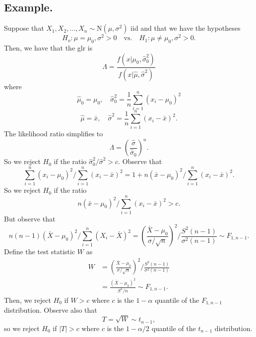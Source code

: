 \documentclass[titlepage]{article}
\begin{document}
\subsection{Example.} Suppose that $X_{1}, X_{2}, \ldots, X_{n} \sim \text{N}(\mu, \sigma^{2})$ iid and that we have the hypotheses 
$$H_{o}: \mu = \mu_{0}, \sigma^{2} > 0 \quad \text{vs.} \quad H_{1}: \mu \neq \mu_{0}, \sigma^{2} > 0.$$
Then, we have that the glr is 
$$\Lambda = \frac{f(x|\mu_{0}, \hat{\sigma}_{0}^{2})}{f(x|\hat{\mu}, \hat{\sigma}^{2})}$$
where 
$$\hat{\mu}_{0} = \mu_{0}, \quad \hat{\sigma}_{0}^{2} = \frac{1}{n}\sum_{i=1}^{n}(x_{i} - \mu_{0})^{2}$$
$$\hat{\mu} = \bar{x}, \quad \hat{\sigma}^{2} = \frac{1}{n}\sum_{i=1}^{n}(x_{i} - \bar{x})^{2}.$$
The likelihood ratio simplifies to 
$$\Lambda = \left(\frac{\hat{\sigma}}{\hat{\sigma}_{0}}\right)^{n}.$$
So we reject $H_{0}$ if the ratio $\hat{\sigma}^{2}_{0}/\hat{\sigma}^{2} > c$. Observe that 
$$\sum_{i=1}^{n}(x_{i}-\mu_{0})^{2} / \sum_{i=1}^{n}(x_{i}-\bar{x})^{2} = 1 + n(\bar{x} - \mu_{0})^{2}/\sum_{i=1}^{n}(x_{i}-\bar{x})^{2}.$$
So we reject $H_{0}$ if the ratio
$$n(\bar{x} - \mu_{0})^{2}/\sum_{i=1}^{n}(x_{i}-\bar{x})^{2} > c.$$
But observe that 
$$n(n-1)(\bar{X} - \mu_{0})^{2}/\sum_{i=1}^{n}(X_{i} - \bar{X})^{2} = \left(\frac{\bar{X}-\mu_{0}}{\sigma/\sqrt{n}}\right)^{2} / \frac{S^{2}(n-1)}{\sigma^{2}(n-1)} \sim F_{1, n-1}.$$
Define the test statistic $W$ as 
\begin{align*}
    W &= \left(\frac{\bar{X}-\mu_{0}}{\sigma/\sqrt{n}}\right)^{2} / \frac{S^{2}(n-1)}{\sigma^{2}(n-1)} \\
      &= \frac{(\bar{X}-\mu_{0})^{2}}{S^{2}/n} \sim F_{1, n-1}.
\end{align*}
Then, we reject $H_{0}$ if $W > c$ where $c$ is the $1-\alpha$ quantile of the $F_{1, n-1}$ distribution. Observe also that 
$$T = \sqrt{W} \sim t_{n-1},$$
so we reject $H_{0}$ if $|T| > c$ where $c$ is the $1-\alpha/2$ quantile of the $t_{n-1}$ distribution.
\end{document}
